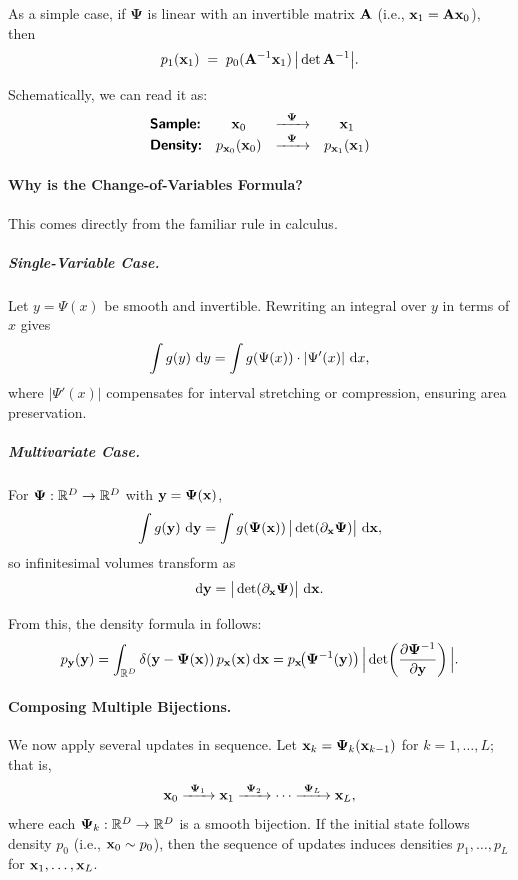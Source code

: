 As a simple case, if $\bm{\Psi}$ is linear with an invertible matrix ${\mathbf{A}}$ (i.e., ${\mathbf{x}}_1={\mathbf{A}}{\mathbf{x}}_0$), then
\[
p_1({\mathbf{x}}_1)\;=\;p_0({\mathbf{A}}^{-1}{\mathbf{x}}_1)\,\big|\det {\mathbf{A}}^{-1}\big|.
\]

Schematically, we can read it as:
\[
\begin{array}{lccc}
   \text{{\sffamily\textbf{Sample:}}} & {\mathbf{x}}_0 & \xrightarrow{\hspace{0.2cm} \bm{\Psi} \hspace{0.2cm}} & {\mathbf{x}}_1  \\
   \text{{\sffamily\textbf{Density:}}} & p_{{\mathbf{x}}_0}({\mathbf{x}}_0) & \xrightarrow{\hspace{0.2cm} \bm{\Psi} \hspace{0.2cm}} & p_{{\mathbf{x}}_1}({\mathbf{x}}_1) 
\end{array}
\]

\paragraph{Why is  the Change-of-Variables Formula?}
This comes directly from the familiar rule in calculus.

\subparagraph{Single-Variable Case.}
Let $y = \Psi(x)$ be smooth and invertible. Rewriting an integral over $y$ in terms of $x$ gives
\[
\int g(y)\,\mathop{}\!\mathrm{d} y = \int g(\Psi(x)) \cdot |\Psi'(x)|\,\mathop{}\!\mathrm{d} x,
\]
where $|\Psi'(x)|$ compensates for interval stretching or compression, ensuring area preservation.

\subparagraph{Multivariate Case.}
For $\bm{\Psi}: \mathbb{R}^D \to \mathbb{R}^D$ with ${\mathbf{y}}=\bm{\Psi}({\mathbf{x}})$,
\[
\int g({\mathbf{y}})\,\mathop{}\!\mathrm{d}{\mathbf{y}}
= \int g(\bm{\Psi}({\mathbf{x}})) \,\big|\det(\partial_{\mathbf{x}} \bm{\Psi})\big| \,\mathop{}\!\mathrm{d}{\mathbf{x}},
\]
so infinitesimal volumes transform as
\[
\mathop{}\!\mathrm{d} {\mathbf{y}} = \big|\det(\partial_{\mathbf{x}} \bm{\Psi})\big|\,\mathop{}\!\mathrm{d} {\mathbf{x}}.
\]

From this, the density formula in  follows:
\begin{align*}
p_{{\mathbf{y}}}({\mathbf{y}})
= \int_{\mathbb{R}^D} \delta({\mathbf{y}} - \bm{\Psi}({\mathbf{x}}))\, p_{{\mathbf{x}}}({\mathbf{x}})\mathop{}\!\mathrm{d} {\mathbf{x}} = p_{{\mathbf{x}}}\!\big(\bm{\Psi}^{-1}({\mathbf{y}})\big)\,\Big|\det\!\left(\frac{\partial \bm{\Psi}^{-1}}{\partial {\mathbf{y}}}\right)\Big|.
\end{align*}



\paragraph{Composing Multiple Bijections.} We now apply several updates in sequence.  
Let ${\mathbf{x}}_k = \bm{\Psi}_k({\mathbf{x}}_{k-1})$ for $k=1,\dots,L$; that is,
\[
\rvx_0 \xrightarrow{\ \bm{\Psi}_1\ } \rvx_1 \xrightarrow{\ \bm{\Psi}_2\ } \cdots
\xrightarrow{\ \bm{\Psi}_L\ } \rvx_L,
\]
where each $\bm{\Psi}_k:\mathbb{R}^D \to \mathbb{R}^D$ is a smooth bijection.  
If the initial state follows density $p_0$ (i.e., ${\mathbf{x}}_0 \sim p_0$), then the sequence of updates induces densities $p_1,\dots,p_L$ for ${\mathbf{x}}_1,\dots,{\mathbf{x}}_L$.  

